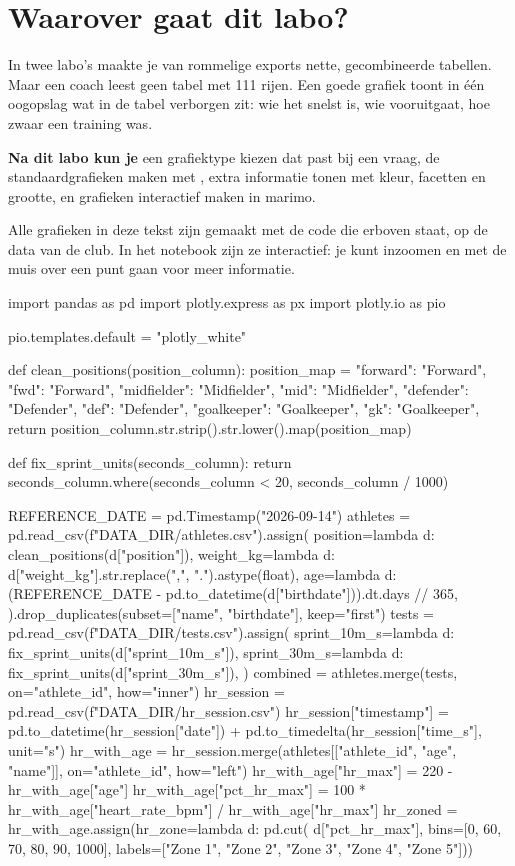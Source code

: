 \documentclass[11pt,a4paper]{article}
\author{dr. Maarten Slembrouck}
\begin{document}

\section*{Waarover gaat dit labo?}

In twee labo's maakte je van rommelige exports nette, gecombineerde
tabellen. Maar een coach leest geen tabel met 111 rijen. Een goede
grafiek toont in één oogopslag wat in de tabel verborgen zit: wie het
snelst is, wie vooruitgaat, hoe zwaar een training was.

\textbf{Na dit labo kun je} een grafiektype kiezen dat past bij een
vraag, de standaardgrafieken maken met , extra
informatie tonen met kleur, facetten en grootte, en grafieken
interactief maken in marimo.

Alle grafieken in deze tekst zijn gemaakt met de code die erboven staat,
op de data van de club. In het notebook zijn ze interactief: je kunt
inzoomen en met de muis over een punt gaan voor meer informatie.

\begin{python}[hide]
import pandas as pd
import plotly.express as px
import plotly.io as pio

pio.templates.default = "plotly_white"

def clean_positions(position_column):
    position_map = {
        "forward": "Forward", "fwd": "Forward",
        "midfielder": "Midfielder", "mid": "Midfielder",
        "defender": "Defender", "def": "Defender",
        "goalkeeper": "Goalkeeper", "gk": "Goalkeeper",
    }
    return position_column.str.strip().str.lower().map(position_map)

def fix_sprint_units(seconds_column):
    return seconds_column.where(seconds_column < 20, seconds_column / 1000)

REFERENCE_DATE = pd.Timestamp("2026-09-14")
athletes = pd.read_csv(f"{DATA_DIR}/athletes.csv").assign(
    position=lambda d: clean_positions(d["position"]),
    weight_kg=lambda d: d["weight_kg"].str.replace(",", ".").astype(float),
    age=lambda d: (REFERENCE_DATE - pd.to_datetime(d["birthdate"])).dt.days // 365,
).drop_duplicates(subset=["name", "birthdate"], keep="first")
tests = pd.read_csv(f"{DATA_DIR}/tests.csv").assign(
    sprint_10m_s=lambda d: fix_sprint_units(d["sprint_10m_s"]),
    sprint_30m_s=lambda d: fix_sprint_units(d["sprint_30m_s"]),
)
combined = athletes.merge(tests, on="athlete_id", how="inner")
hr_session = pd.read_csv(f"{DATA_DIR}/hr_session.csv")
hr_session["timestamp"] = pd.to_datetime(hr_session["date"]) + pd.to_timedelta(hr_session["time_s"], unit="s")
hr_with_age = hr_session.merge(athletes[["athlete_id", "age", "name"]], on="athlete_id", how="left")
hr_with_age["hr_max"] = 220 - hr_with_age["age"]
hr_with_age["pct_hr_max"] = 100 * hr_with_age["heart_rate_bpm"] / hr_with_age["hr_max"]
hr_zoned = hr_with_age.assign(hr_zone=lambda d: pd.cut(
    d["pct_hr_max"], bins=[0, 60, 70, 80, 90, 1000],
    labels=["Zone 1", "Zone 2", "Zone 3", "Zone 4", "Zone 5"]))
\end{python}
\end{document}
